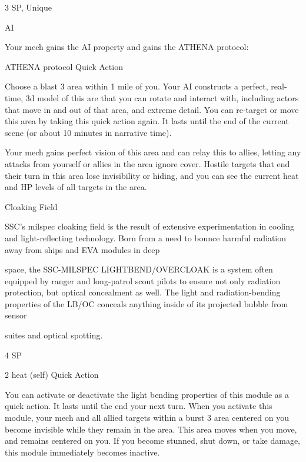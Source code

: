    
3 SP, Unique
 
AI  

Your mech gains the AI property and gains the ATHENA protocol:
 

         ATHENA protocol  
          Quick Action
 
          Choose a blast 3 area within 1 mile of you. Your AI constructs a perfect, real-time, 3d  
          model of this are that you can rotate and interact with, including actors that move in and  
          out of that area, and extreme detail. You can re-target or move this area by taking this  
          quick action again. It lasts until the end of the current scene (or about 10 minutes in  
          narrative time).
 

         Your mech gains perfect vision of this area and can relay this to allies, letting any attacks  
         from yourself or allies in the area ignore cover. Hostile targets that end their turn in this  
          area lose invisibility or hiding, and you can see the current heat and HP levels of all  
         targets in the area.
 

Cloaking Field  

SSC’s milspec cloaking field is the result of extensive experimentation in cooling and light-reflecting  
technology. Born from a need to bounce harmful radiation away from ships and EVA modules in deep  

space, the SSC-MILSPEC LIGHTBEND/OVERCLOAK is a system often equipped by ranger and long-patrol  
scout pilots to ensure not only radiation protection, but optical concealment as well. The light and  
radiation-bending properties of the LB/OC conceals anything inside of its projected bubble from sensor  

suites and optical spotting.   

4 SP  

2 heat (self)  
Quick Action
 
You can activate or deactivate the light bending properties of this module as a quick action. It  
lasts until the end your next turn. When you activate this module, your mech and all allied targets  
within a burst 3 area centered on you become invisible while they remain in the area. This area  
moves when you move, and remains centered on you. If you become stunned, shut down, or  
take damage, this module immediately becomes inactive.
 